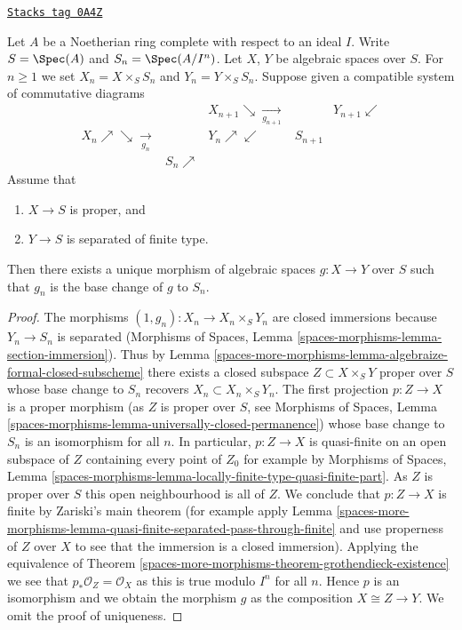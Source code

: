 \begin{lemma}
\label{spaces-more-morphisms-lemma-algebraize-morphism}
\href{https://stacks.math.columbia.edu/tag/0A4Z}{\texttt{Stacks tag 0A4Z}}

Let $A$ be a Noetherian ring complete with respect to an ideal $I$.
Write $S = \Spec(A)$ and $S_n = \Spec(A/I^n)$. Let $X$, $Y$ be algebraic
spaces over $S$. For $n \geq 1$ we set $X_n = X \times_S S_n$ and
$Y_n = Y \times_S S_n$. Suppose given a compatible system of
commutative diagrams
$$
\begin{array}{ccccc} &  & X_{n + 1} \searrow\underset{g_{n + 1}}{\longrightarrow} &  & Y_{n + 1} \swarrow \\ X_n \nearrow\searrow\underset{g_n}{\longrightarrow} &  & Y_n \nearrow\swarrow & S_{n + 1} &  \\  & S_n \nearrow &  &  & \end{array}
$$
Assume that
\begin{enumerate}
\item $X \to S$ is proper, and
\item $Y \to S$ is separated of finite type.
\end{enumerate}
Then there exists a unique morphism of algebraic spaces $g : X \to Y$
over $S$ such that $g_n$ is the base change of $g$ to $S_n$.
\end{lemma}

\begin{proof}
The morphisms $(1, g_n) : X_n \to X_n \times_S Y_n$ are closed immersions
because $Y_n \to S_n$ is separated
(Morphisms of Spaces, Lemma \ref{spaces-morphisms-lemma-section-immersion}).
Thus by Lemma \ref{spaces-more-morphisms-lemma-algebraize-formal-closed-subscheme}
there exists a closed subspace $Z \subset X \times_S Y$
proper over $S$ whose base change to $S_n$ recovers
$X_n \subset X_n \times_S Y_n$. The first projection $p : Z \to X$
is a proper morphism (as $Z$ is proper over $S$, see
Morphisms of Spaces, Lemma
\ref{spaces-morphisms-lemma-universally-closed-permanence})
whose base change to $S_n$ is an isomorphism for all $n$.
In particular, $p : Z \to X$ is quasi-finite on an open subspace
of $Z$ containing every point of $Z_0$ for example by
Morphisms of Spaces, Lemma
\ref{spaces-morphisms-lemma-locally-finite-type-quasi-finite-part}.
As $Z$ is proper over $S$ this open neighbourhood is all of $Z$.
We conclude that $p : Z \to X$ is finite by Zariski's main theorem
(for example apply
Lemma \ref{spaces-more-morphisms-lemma-quasi-finite-separated-pass-through-finite}
and use properness of $Z$ over $X$ to see that the immersion is
a closed immersion). Applying the equivalence of
Theorem \ref{spaces-more-morphisms-theorem-grothendieck-existence}
we see that $p_*\mathcal{O}_Z = \mathcal{O}_X$ as this is true
modulo $I^n$ for all $n$. Hence $p$ is an isomorphism and we obtain
the morphism $g$ as the composition $X \cong Z \to Y$.
We omit the proof of uniqueness.
\end{proof}

